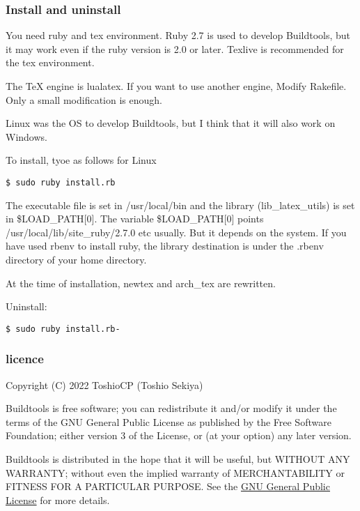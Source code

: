 \documentclass[
]{article}
\begin{document}
\hypertarget{install-and-uninstall}{%
\subsubsection{Install and uninstall}\label{install-and-uninstall}}

You need ruby \hspace{0pt}\hspace{0pt}and tex environment. Ruby 2.7 is
used to develop Buildtools, but it may work even if the ruby version is
\hspace{0pt}\hspace{0pt}2.0 or later. Texlive is recommended for the tex
environment.

The TeX engine is lualatex. If you want to use another engine, Modify
Rakefile. Only a small modification is enough.

Linux was the OS to develop Buildtools, but I think that it will also
work on Windows.

To install, tyoe as follows for Linux

\begin{verbatim}
$ sudo ruby ​​install.rb
\end{verbatim}

The executable file is set in /usr/local/bin and the library
(lib\_latex\_utils) is set in \$LOAD\_PATH{[}0{]}. The variable
\$LOAD\_PATH{[}0{]} points /usr/local/lib/site\_ruby/2.7.0 etc usually.
But it depends on the system. If you have used rbenv to install ruby,
the library destination is under the .rbenv directory of your home
directory.

At the time of installation, newtex and arch\_tex are rewritten.

Uninstall:

\begin{verbatim}
$ sudo ruby ​​install.rb-
\end{verbatim}

\hypertarget{licence}{%
\subsubsection{licence}\label{licence}}

Copyright (C) 2022 ToshioCP (Toshio Sekiya)

Buildtools is free software; you can redistribute it and/or modify it
under the terms of the GNU General Public License as published by the
Free Software Foundation; either version 3 of the License, or (at your
option) any later version.

Buildtools is distributed in the hope that it will be useful, but
WITHOUT ANY WARRANTY; without even the implied warranty of
MERCHANTABILITY or FITNESS FOR A PARTICULAR PURPOSE. See the
\href{https://www.gnu.org/licenses/gpl-3.0.html}{GNU General Public
License} for more details.
\end{document}
